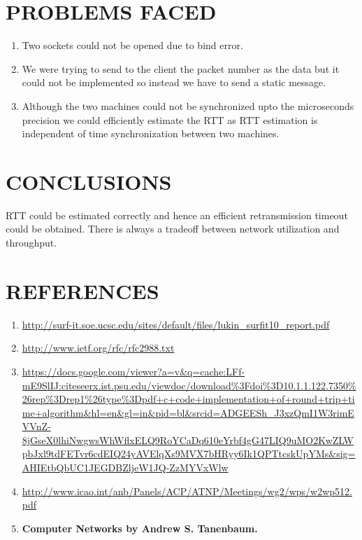 \documentclass[12pt]{article}
\begin{document}
\section{PROBLEMS FACED}
\begin{enumerate}
\item Two sockets could not be opened due to bind error.
\item We were trying to send to the client the packet number as the data but it could not be implemented so instead we have to send a static message.
\item Although the two machines could not be synchronized upto the microseconds precision we could efficiently estimate the RTT as RTT estimation is independent of time synchronization between two machines.

\end{enumerate}
\section{CONCLUSIONS}
RTT could be estimated correctly and hence an efficient retransmission timeout could be obtained. There is always a tradeoff between network utilization and throughput. 

\section{REFERENCES}
\begin{enumerate}
\item \url{http://surf-it.soe.ucsc.edu/sites/default/files/lukin_surfit10_report.pdf}
\item \url{http://www.ietf.org/rfc/rfc2988.txt}
\item \url{https://docs.google.com/viewer?a=v&q=cache:LFf-mE9SlIJ:citeseerx.ist.psu.edu/viewdoc/download\%3Fdoi\%3D10.1.1.122.7350\%26rep\%3Drep1\%26type\%3Dpdf+c+code+implementation+of+round+trip+time+algorithm\&hl=en\&gl=in\&pid=bl\&srcid=ADGEESh_J3xzQmI1W3rimEVVnZ-8jGseX0lhiNwgwsWhWflxELQ9RoYCaDq610eYrbf4gG47LIQ9uMO2KwZLWpbJxl9tdFETvr6cdEIQ24yAVElqXs9MVX7bHRyy6Ik1QPTtcskUpYMs\&sig=AHIEtbQbUC1JEGDBZljeW1JQ-ZzMYVxWlw}
\item \url{http://www.icao.int/anb/Panels/ACP/ATNP/Meetings/wg2/wps/w2wp512.pdf}
\item 	\bf Computer Networks by Andrew S. Tanenbaum. \rm
\end{enumerate}
\end{document}
